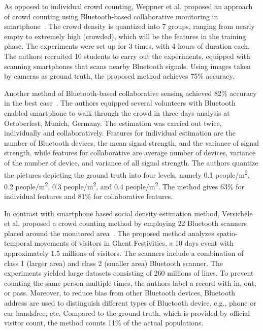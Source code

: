 	As opposed to individual crowd counting, Weppner et al. proposed an approach of crowd counting using Bluetooth-based collaborative monitoring in smartphone~\cite{thesis008}. The crowd density is quantized into 7 groups, ranging from nearly empty to extremely high (crowded), which will be the features in the training phase. The experiments were set up for 3 times, with 4 hours of duration each. The authors recruited 10 students to carry out the experiments, equipped with scanning smartphones that scans nearby Bluetooth signals. Using images taken by cameras as ground truth, the proposed method achieves 75\% accuracy.

	Another method of Bluetooth-based collaborative sensing achieved 82\% accuracy in the best case~\cite{thesis041}. The authors equipped several volunteers with Bluetooth enabled smartphone to walk through the crowd in three days analysis at Octoberfest, Munich, Germany. The estimation was carried out twice, individually and collaboratively. Features for individual estimation are the number of Bluetooth devices, the mean signal strength, and the variance of signal strength, while features for collaborative are average number of devices, variance of the number of device, and variance of all signal strength. The authors quantize the pictures depicting the ground truth into four levels, namely 0.1 people/m\textsuperscript{2}, 0.2 people/m\textsuperscript{2}, 0.3 people/m\textsuperscript{2}, and 0.4 people/m\textsuperscript{2}. The method gives 63\% for individual features and 81\% for collaborative features.

	In contrast with smartphone based social density estimation method, Versichele et al. proposed a crowd counting method by employing 22 Bluetooth scanners placed around the monitored area~\cite{thesis016}. The proposed method analyzes spatio-temporal movements of visitors in Ghent Festivities, a 10 days event with approximately 1.5 millions of visitors. The scanners include a combination of class 1 (larger area) and class 2 (smaller area) Bluetooth scanner. The experiments yielded large datasets consisting of 260 millions of lines. To prevent counting the same person multiple times, the authors label a record with in, out, or pass. Moreover, to reduce bias from other Bluetooth devices, Bluetooth address are used to distinguish different types of Bluetooth device, e.g., phone or car handsfree, etc. Compared to the ground truth, which is provided by official visitor count, the method counts 11\% of the actual populations.
	

